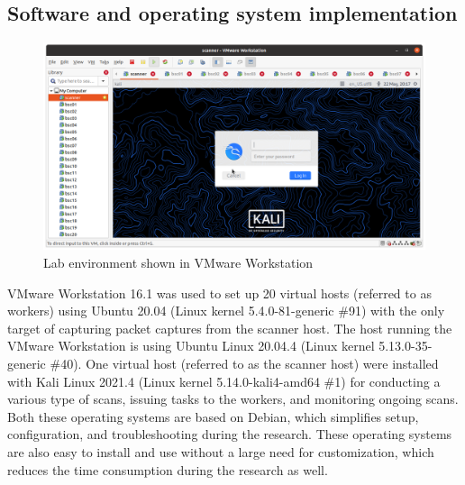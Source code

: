 \subsection{Software and operating system implementation}
\label{s:LabEnv}
\begin{figure}[htbp]
\centerline{\includegraphics[scale=0.35]{images/lab/vmware-lab.png}}
\caption{Lab environment shown in VMware Workstation}
\label{fig:LabVMware}
\end{figure}

VMware Workstation 16.1 was used to set up 20 virtual hosts (referred to as workers) using Ubuntu 20.04 (Linux kernel 5.4.0-81-generic \#91) with the only target of capturing packet captures from the scanner host.
The host running the VMware Workstation is using Ubuntu Linux 20.04.4 (Linux kernel 5.13.0-35-generic \#40).
One virtual host (referred to as the scanner host) were installed with Kali Linux 2021.4 (Linux kernel 5.14.0-kali4-amd64 \#1) for conducting a various type of scans, issuing tasks to the workers, and monitoring ongoing scans.
Both these operating systems are based on Debian, which simplifies setup, configuration, and troubleshooting during the research. These operating systems are also easy to install and use without a large need for customization, which reduces the time consumption during the research as well.
